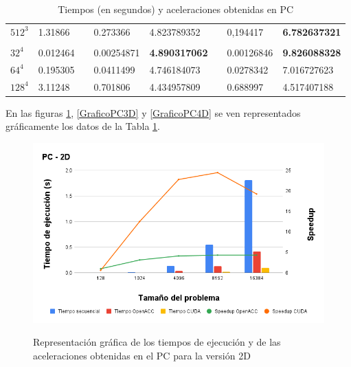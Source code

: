 \begin{table}[H]
\begin{tabular}{llllllll}
    $512^3$                & 1.31866                        &                      & 0.273366    & 4.823789352          &                      & 0,194417  & \textbf{6.782637321}  \\
                    &                                &                      &             &                      &                      &             &                       \\
    $32^4$                & 0.012464                       &                      & 0.00254871  & \textbf{4.890317062} &                      & 0.00126846  & \textbf{9.826088328}  \\
    $64^4$                & 0.195305                       &                      & 0.0411499   & 4.746184073          &                      & 0.0278342   & 7.016727623           \\
    $128^4$                & 3.11248                        &                      & 0.701806    & 4.434957809          &                      & 0.688997    & 4.517407188          
    \end{tabular}
    \caption{Tiempos (en segundos) y aceleraciones obtenidas en PC}
    \label{TiemposPC}
    \end{table}
\raggedbottom 
En las figuras \ref{GraficoPC2D}, \ref{GraficoPC3D} y \ref{GraficoPC4D} se ven representados gráficamente los datos de la Tabla \ref{TiemposPC}.

\begin{figure}[H]
    \centering
    \includegraphics[width=\textwidth]{img/PC - 2D.png}
    \label{GraficoPC2D}
    \caption{Representación gráfica de los tiempos de ejecución y de las aceleraciones obtenidas en el PC para la versión 2D }
\end{figure}


